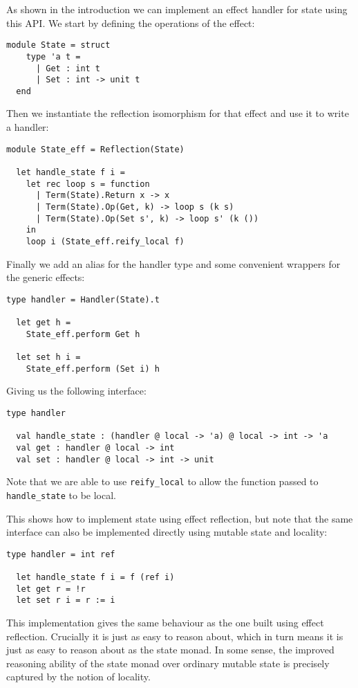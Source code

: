 \documentclass[acmsmall, screen, nonacm]{acmart}
\theoremstyle{definition}
\begin{document}
As shown in the introduction we can implement an effect handler for
state using this API. We start by defining the operations of the effect:
\begin{lstlisting}[style=oxcaml]
  module State = struct
    type 'a t =
      | Get : int t
      | Set : int -> unit t
  end
\end{lstlisting}
Then we instantiate the reflection isomorphism for that effect and use
it to write a handler:
\begin{lstlisting}[style=oxcaml]
  module State_eff = Reflection(State)

  let handle_state f i =
    let rec loop s = function
      | Term(State).Return x -> x
      | Term(State).Op(Get, k) -> loop s (k s)
      | Term(State).Op(Set s', k) -> loop s' (k ())
    in
    loop i (State_eff.reify_local f)
\end{lstlisting}
Finally we add an alias for the handler type and some convenient
wrappers for the generic effects:
\begin{lstlisting}[style=oxcaml]
  type handler = Handler(State).t

  let get h =
    State_eff.perform Get h

  let set h i =
    State_eff.perform (Set i) h
\end{lstlisting}
Giving us the following interface:
\begin{lstlisting}[style=oxcaml]
  type handler

  val handle_state : (handler @ local -> 'a) @ local -> int -> 'a
  val get : handler @ local -> int
  val set : handler @ local -> int -> unit
\end{lstlisting}
Note that we are able to use \lstinline[style=oxcaml]{reify_local} to allow
the function passed to \lstinline[style=oxcaml]{handle_state} to be local.

This shows how to implement state using effect reflection, but note that
the same interface can also be implemented directly using mutable state
and locality:
\begin{lstlisting}[style=oxcaml]
  type handler = int ref

  let handle_state f i = f (ref i)
  let get r = !r
  let set r i = r := i
\end{lstlisting}
This implementation gives the same behaviour as the one built using
effect reflection. Crucially it is just as easy to reason about, which
in turn means it is just as easy to reason about as the state monad. In
some sense, the improved reasoning ability of the state monad over
ordinary mutable state is precisely captured by the notion of locality.
\end{document}
